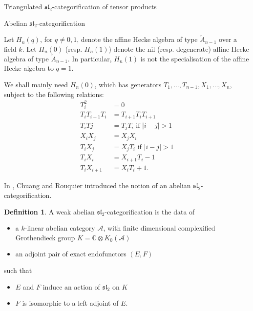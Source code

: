 \documentclass[12pt]{amsart}
\theoremstyle{definition}
\newtheorem{defn}[thm]{Definition}
\theoremstyle{remark}
\theoremstyle{remark}
\begin{document}
\tableofcontents
 
\begin{section}{Triangulated $\mathfrak{sl}_{2}$-categorification of tensor products} 

\begin{subsection}{Abelian $\mathfrak{sl}_{2}$-categorification} \label{RelnsHeck}

Let $H_{n}(q)$, for $q \not= 0,1$, denote the affine Hecke algebra of type $\widetilde{A}_{n-1}$ over a field $k$. Let $H_{n}(0)$ (resp. $H_{n}(1)$) denote the nil (resp. degenerate) affine Hecke algebra of type $\widetilde{A}_{n-1}$. In particular, $H_{n}(1)$ is not the specialisation of the affine Hecke algebra to $q=1$.

We shall mainly need $H_{n}(0)$, which has generators $T_{1},\ldots,T_{n-1},X_{1},\ldots,X_{n}$, subject to the following relations: \begin{align*}  T_{i}^{2} &= 0 \\ T_{i}T_{i+1}T_{i} &= T_{i+1}T_{i}T_{i+1} \\ T_{i}T{j} &= T_{j}T_{i} \text{ \ if } \left| i - j \right| > 1  \\ X_{i}X_{j} &= X_{j}X_{i} \\ T_{i}X_{j} &= X_{j}T_{i} \text{ \ if } \left| i - j \right| > 1 \\ T_{i}X_{i}  &= X_{i+1}T_{i} - 1 \\ T_{i}X_{i+1}  &= X_{i}T_{i} + 1. \end{align*}  

In \cite{ChuangRouquierDerivedEquivalencesSymmetricGroupsCategorification}, Chuang and Rouquier introduced the notion of an abelian $\mathfrak{sl}_{2}$-categorification. 

\begin{defn} A weak abelian $\mathfrak{sl}_{2}$-categorification is the data of \begin{itemize} \item a $k$-linear abelian category $\mathcal{A}$, with finite dimensional complexified Grothendieck group $K =\mathbb{C} \otimes K_{0}(\mathcal{A})$ \item an adjoint pair of exact endofunctors $(E,F)$ \end{itemize} such that \begin{itemize} \item $E$ and $F$ induce an action of $\mathfrak{sl}_{2}$ on $K$ \item $F$ is isomorphic to a left adjoint of $E$. \end{itemize} \end{defn}


\end{subsection}
\end{section}
\end{document}
